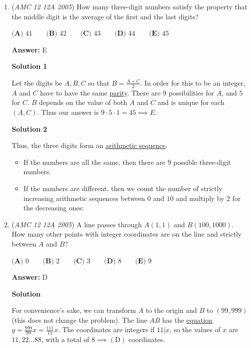 \begin{enumerate}
	\item (\textit{AMC 12 12A 2005}) How many three-digit numbers satisfy the property that the middle digit is the average of the first and the last digits?


 $\textbf{(A) } 41 \qquad \textbf{(B) } 42 \qquad \textbf{(C) } 43 \qquad \textbf{(D) } 44 \qquad \textbf{(E) } 45$

 \textbf{Answer: }E



\textbf{Solution 1}

Let the digits be $A, B, C$ so that $B = \frac {A + C}{2}$. In order for this to be an integer, $A$ and $C$ have to have the same \href{https://artofproblemsolving.com/wiki/index.php?title=Parity}{parity}. There are $9$ possibilities for $A$, and $5$ for $C$. $B$ depends on the value of both $A$ and $C$ and is unique for each $(A,C)$. Thus our answer is $9 \cdot 5 \cdot 1 = 45 \implies E$.

 



\textbf{Solution 2}

Thus, the three digits form an \href{https://artofproblemsolving.com/wiki/index.php?title=Arithmetic\_sequence}{arithmetic sequence}. 

 
            \begin{itemize}
        \item If the numbers are all the same, then there are $9$ possible three-digit numbers.
        \item If the numbers are different, then we count the number of strictly increasing arithmetic sequences between $0$ and $10$ and multiply by 2 for the decreasing ones:
            \end{itemize}
            


	\item (\textit{AMC 12 12A 2005}) A line passes through $A(1,1)$ and $B(100,1000)$. How many other points with integer coordinates are on the line and strictly between $A$ and $B$?


 $\textbf{(A) } 0 \qquad \textbf{(B) } 2 \qquad \textbf{(C) } 3 \qquad \textbf{(D) } 8 \qquad \textbf{(E) } 9$

 \textbf{Answer: }D



\textbf{Solution}

For convenience’s sake, we can transform $A$ to the origin and $B$ to $(99,999)$ (this does not change the problem). The line $AB$ has the \href{https://artofproblemsolving.com/wiki/index.php?title=Equation}{equation} $y = \frac{999}{99}x = \frac{111}{11}x$. The coordinates are integers if $11|x$, so the values of $x$ are $11, 22 \ldots 88$, with a total of $8\implies \boxed{\mathrm{(D)}}$ coordinates.


\end{enumerate}
